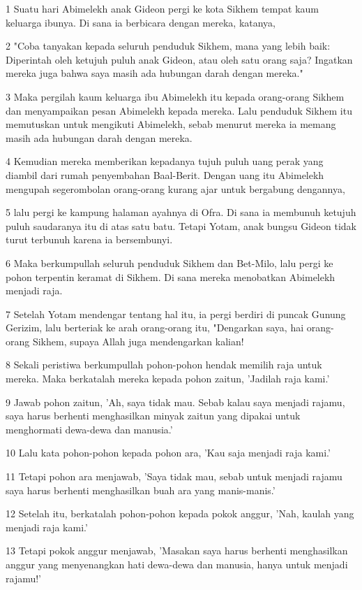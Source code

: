 \par 1 Suatu hari Abimelekh anak Gideon pergi ke kota Sikhem tempat kaum keluarga ibunya. Di sana ia berbicara dengan mereka, katanya,
\par 2 "Coba tanyakan kepada seluruh penduduk Sikhem, mana yang lebih baik: Diperintah oleh ketujuh puluh anak Gideon, atau oleh satu orang saja? Ingatkan mereka juga bahwa saya masih ada hubungan darah dengan mereka."
\par 3 Maka pergilah kaum keluarga ibu Abimelekh itu kepada orang-orang Sikhem dan menyampaikan pesan Abimelekh kepada mereka. Lalu penduduk Sikhem itu memutuskan untuk mengikuti Abimelekh, sebab menurut mereka ia memang masih ada hubungan darah dengan mereka.
\par 4 Kemudian mereka memberikan kepadanya tujuh puluh uang perak yang diambil dari rumah penyembahan Baal-Berit. Dengan uang itu Abimelekh mengupah segerombolan orang-orang kurang ajar untuk bergabung dengannya,
\par 5 lalu pergi ke kampung halaman ayahnya di Ofra. Di sana ia membunuh ketujuh puluh saudaranya itu di atas satu batu. Tetapi Yotam, anak bungsu Gideon tidak turut terbunuh karena ia bersembunyi.
\par 6 Maka berkumpullah seluruh penduduk Sikhem dan Bet-Milo, lalu pergi ke pohon terpentin keramat di Sikhem. Di sana mereka menobatkan Abimelekh menjadi raja.
\par 7 Setelah Yotam mendengar tentang hal itu, ia pergi berdiri di puncak Gunung Gerizim, lalu berteriak ke arah orang-orang itu, "Dengarkan saya, hai orang-orang Sikhem, supaya Allah juga mendengarkan kalian!
\par 8 Sekali peristiwa berkumpullah pohon-pohon hendak memilih raja untuk mereka. Maka berkatalah mereka kepada pohon zaitun, 'Jadilah raja kami.'
\par 9 Jawab pohon zaitun, 'Ah, saya tidak mau. Sebab kalau saya menjadi rajamu, saya harus berhenti menghasilkan minyak zaitun yang dipakai untuk menghormati dewa-dewa dan manusia.'
\par 10 Lalu kata pohon-pohon kepada pohon ara, 'Kau saja menjadi raja kami.'
\par 11 Tetapi pohon ara menjawab, 'Saya tidak mau, sebab untuk menjadi rajamu saya harus berhenti menghasilkan buah ara yang manis-manis.'
\par 12 Setelah itu, berkatalah pohon-pohon kepada pokok anggur, 'Nah, kaulah yang menjadi raja kami.'
\par 13 Tetapi pokok anggur menjawab, 'Masakan saya harus berhenti menghasilkan anggur yang menyenangkan hati dewa-dewa dan manusia, hanya untuk menjadi rajamu!'
